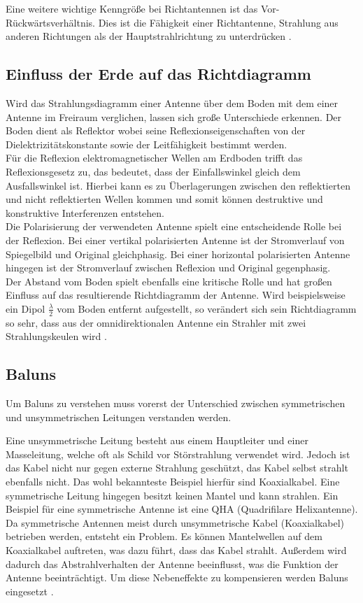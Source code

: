 Eine weitere wichtige Kenngröße bei Richtantennen ist das Vor-Rückwärtsverhältnis. Dies ist die Fähigkeit einer Richtantenne, Strahlung aus anderen Richtungen als der Hauptstrahlrichtung zu unterdrücken \cite{Kraus-2002-AntennasB}.

\subsection{Einfluss der Erde auf das Richtdiagramm}
Wird das Strahlungsdiagramm einer Antenne über dem Boden mit dem einer Antenne im Freiraum verglichen, lassen sich große Unterschiede erkennen. Der Boden dient als Reflektor wobei seine Reflexionseigenschaften von der Dielektrizitätskonstante sowie der Leitfähigkeit bestimmt werden.\\

Für die Reflexion elektromagnetischer Wellen am Erdboden trifft das Reflexionsgesetz zu, das bedeutet, dass der Einfallswinkel gleich dem Ausfallswinkel ist. Hierbei kann es zu Überlagerungen zwischen den reflektierten und nicht reflektierten Wellen kommen und somit können destruktive und konstruktive Interferenzen entstehen.\\

Die Polarisierung der verwendeten Antenne spielt eine entscheidende Rolle bei der Reflexion. Bei einer vertikal polarisierten Antenne ist der Stromverlauf von Spiegelbild und Original gleichphasig. Bei einer horizontal polarisierten Antenne hingegen ist der Stromverlauf zwischen Reflexion und Original gegenphasig.\\

Der Abstand vom Boden spielt ebenfalls eine kritische Rolle und hat großen Einfluss auf das resultierende Richtdiagramm der Antenne. Wird beispielsweise ein Dipol $\frac{\lambda}{2}$ vom Boden entfernt aufgestellt, so verändert sich sein Richtdiagramm so sehr, dass aus der omnidirektionalen Antenne ein Strahler mit zwei Strahlungskeulen wird \cite{Kraus-2002-AntennasB}. 


\subsection{Baluns}
\label{subsec:baluns}
Um Baluns zu verstehen muss vorerst der Unterschied zwischen symmetrischen und unsymmetrischen Leitungen verstanden werden. 

Eine unsymmetrische Leitung besteht aus einem Hauptleiter und einer Masseleitung, welche oft als Schild vor Störstrahlung verwendet wird. Jedoch ist das Kabel nicht nur gegen externe Strahlung geschützt, das Kabel selbst strahlt ebenfalls nicht. Das wohl bekannteste Beispiel hierfür sind Koaxialkabel. Eine symmetrische Leitung hingegen besitzt keinen Mantel und kann strahlen. Ein Beispiel für eine symmetrische Antenne ist eine QHA (Quadrifilare Helixantenne). Da symmetrische Antennen meist durch unsymmetrische Kabel (Koaxialkabel) betrieben werden, entsteht ein Problem. Es können Mantelwellen auf dem Koaxialkabel auftreten, was dazu führt, dass das Kabel strahlt. Außerdem wird dadurch das Abstrahlverhalten der Antenne beeinflusst, was die Funktion der Antenne beeinträchtigt. Um diese Nebeneffekte zu kompensieren werden Baluns eingesetzt \cite{balun}.

